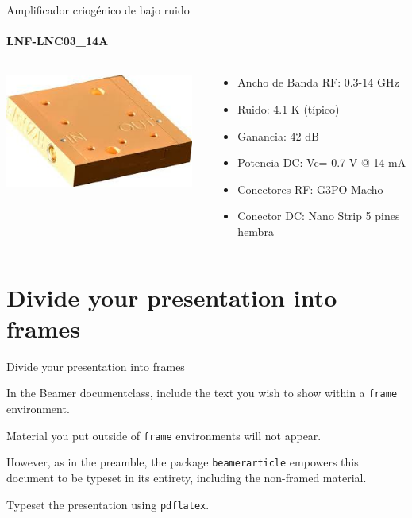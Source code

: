 \documentclass[ignorenonframetext,12pt]{beamer}
\begin{document}
				\begin{frame}{Amplificador criog\'enico de bajo ruido}
								\framesubtitle{LNF-LNC03\_14A}
								\begin{columns}
												\begin{column}{0.40\textwidth}
				\hspace{10mm}\includegraphics[width=0.95\textwidth]{lnf-lnc03_14sa}
												\end{column}
												\begin{column}{0.60\textwidth}
																\begin{itemize}
																				\item Ancho de Banda RF: 0.3-14 GHz
																				\item Ruido: 4.1 K (típico)
																				\item Ganancia: 42 dB
																				\item Potencia DC: Vc= 0.7 V @ 14 mA
																				\item Conectores RF: G3PO Macho
																				\item Conector DC: Nano Strip 5 pines hembra
																\end{itemize}
												\end{column}
								\end{columns}
				\end{frame}



\section{Divide your presentation into frames}
\begin{frame}{Divide your presentation into frames}

				In the Beamer documentclass, include the text you wish to show within a \texttt{frame} environment.

				Material you put outside of \texttt{frame} environments will not appear.

				However, as in the preamble, the package \texttt{beamerarticle} empowers this document to be typeset in its entirety, including the non-framed material.

				Typeset the presentation using \texttt{pdflatex}.
\end{frame}
\end{document}
